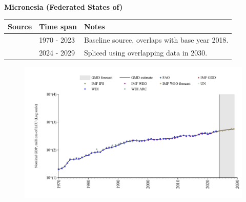 \documentclass[12pt,a4paper,landscape]{article}
\begin{document}
\begin{adjustbox}{max totalsize={\paperwidth}{\paperheight},center}
\begin{minipage}[t][\textheight][t]{\textwidth}
\vspace*{0.5cm}
{}
\begin{center}
{\Large\bfseries Micronesia (Federated States of)}
\end{center}
\vspace{0.5cm}
\begin{table}[H]
\centering
\small
\begin{tabular}{|l|l|l|}
\hline
\textbf{Source} & \textbf{Time span} & \textbf{Notes} \\
\hline
\rowcolor{white}\cite{WDI}& 1970 - 2023 &Baseline source, overlaps with base year 2018.\\
\rowcolor{lightgray}\cite{IMF_WEO_forecast}& 2024 - 2029 &Spliced using overlapping data in 2030.\\
\hline
\end{tabular}
\end{table}
\begin{figure}[H]
\centering
\includegraphics[width=\textwidth,height=0.6\textheight,keepaspectratio]{graphs/FSM_nGDP.pdf}
\end{figure}
\end{minipage}
\end{adjustbox}
\end{document}
